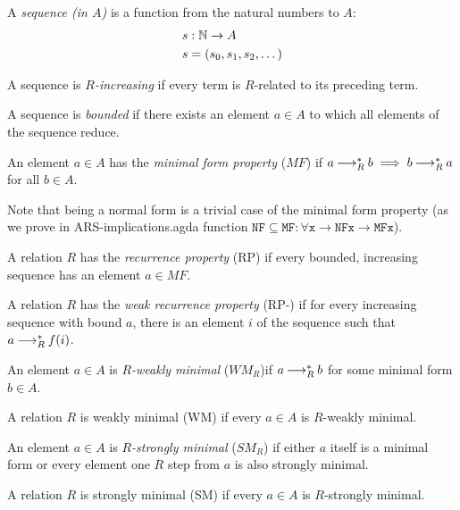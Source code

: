 \begin{definition}
    A \emph{sequence (in $A$)} is a function from the natural numbers to $A$:
    \begin{align*}
      &s : \mathbb{N} \to A \\
      &s = (s_0,s_1,s_2,\dots)
    \end{align*}
\end{definition}

\begin{definition}
    A sequence is \emph{$R$-increasing} if every term is $R$-related to its preceding term.
\end{definition}

\begin{definition}
    A sequence is \emph{bounded} if there exists an element $a \in A$ to which all elements of the sequence reduce.
\end{definition}


\begin{definition}
    An element $a \in A$ has the \emph{minimal form property} ($MF$) if $a \mathbin{\longrightarrow_R^*} b \implies b \mathbin{\longrightarrow_R^*} a$ for all $b \in A$.
\end{definition}

Note that being a normal form is a trivial case of the minimal form property (as we prove in ARS-implications.agda
function $\mathtt{NF\subseteq MF : \forall {x} \to NF x \to MF x}$).

\begin{definition}\label{d:RP}
    A relation $R$ has the \emph{recurrence property} (RP) if every bounded, increasing sequence 
    has an element $a \in MF$.
\end{definition}


\begin{definition}\label{d:RP-}
    A relation $R$ has the \emph{weak recurrence property} (RP-) if for every increasing 
    sequence with bound $a$, there is an element $i$ of the sequence such that 
    $a \mathbin{\longrightarrow_R^*} f(i)$.
\end{definition}


\begin{definition}
    An element $a \in A$ is \emph{$R$-weakly minimal} ($WM_{R}$)if $a \mathbin{\longrightarrow_R^*} b$ for some minimal form $b \in A$.

    A relation $R$ is weakly minimal (WM) if every $a \in A$ is $R$-weakly minimal.
\end{definition}

\begin{definition}
    An element $a \in A$ is \emph{$R$-strongly minimal} ($SM_R$) if either $a$ itself is a minimal form or every element one $R$ step
    from $a$ is also strongly minimal.

    A relation $R$ is strongly minimal (SM) if every
    $a \in A$ is $R$-strongly minimal.
\end{definition}

